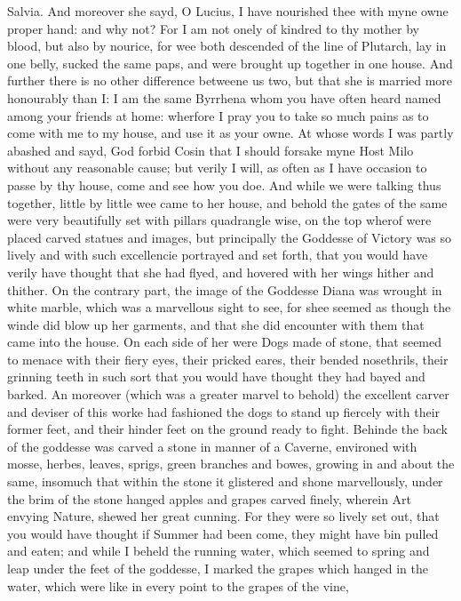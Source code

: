 Salvia. And moreover she sayd, O Lucius, I have nourished thee with myne owne
proper hand: and why not? For I am not onely of kindred to thy mother by blood,
but also by nourice, for wee both descended of the line of Plutarch, lay in one
belly, sucked the same paps, and were brought up together in one house. And
further there is no other difference betweene us two, but that she is married
more honourably than I: I am the same Byrrhena whom you have often heard named
among your friends at home: wherfore I pray you to take so much pains as to
come with me to my house, and use it as your owne. At whose words I was partly
abashed and sayd, God forbid Cosin that I should forsake myne Host Milo without
any reasonable cause; but verily I will, as often as I have occasion to passe
by thy house, come and see how you doe. And while we were talking thus
together, little by little wee came to her house, and behold the gates of the
same were very beautifully set with pillars quadrangle wise, on the top wherof
were placed carved statues and images, but principally the Goddesse of Victory
was so lively and with such excellencie portrayed and set forth, that you would
have verily have thought that she had flyed, and hovered with her wings hither
and thither. On the contrary part, the image of the Goddesse Diana was wrought
in white marble, which was a marvellous sight to see, for shee seemed as though
the winde did blow up her garments, and that she did encounter with them that
came into the house. On each side of her were Dogs made of stone, that seemed
to menace with their fiery eyes, their pricked eares, their bended nosethrils,
their grinning teeth in such sort that you would have thought they had bayed
and barked. An moreover (which was a greater marvel to behold) the excellent
carver and deviser of this worke had fashioned the dogs to stand up fiercely
with their former feet, and their hinder feet on the ground ready to fight.
Behinde the back of the goddesse was carved a stone in manner of a Caverne,
environed with mosse, herbes, leaves, sprigs, green branches and bowes, growing
in and about the same, insomuch that within the stone it glistered and shone
marvellously, under the brim of the stone hanged apples and grapes carved
finely, wherein Art envying Nature, shewed her great cunning. For they were so
lively set out, that you would have thought if Summer had been come, they might
have bin pulled and eaten; and while I beheld the running water, which seemed
to spring and leap under the feet of the goddesse, I marked the grapes which
hanged in the water, which were like in every point to the grapes of the vine,
